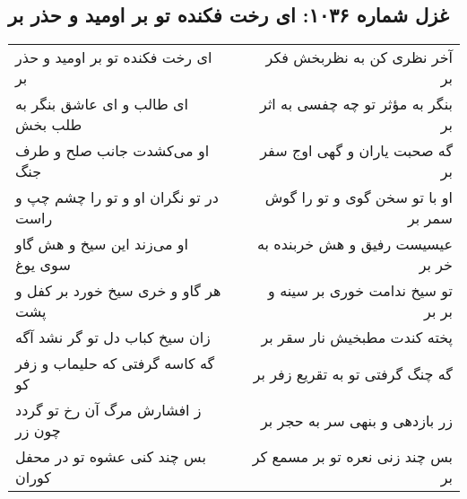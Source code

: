 \begin{center}
\section*{غزل شماره ۱۰۳۶: ای رخت فکنده تو بر اومید و حذر بر}
\label{sec:1036}
\begin{longtable}{l p{0.5cm} r}
ای رخت فکنده تو بر اومید و حذر بر
&&
آخر نظری کن به نظربخش فکر بر
\\
ای طالب و ای عاشق بنگر به طلب بخش
&&
بنگر به مؤثر تو چه چفسی به اثر بر
\\
او می‌کشدت جانب صلح و طرف جنگ
&&
گه صحبت یاران و گهی اوج سفر بر
\\
در تو نگران او و تو را چشم چپ و راست
&&
او با تو سخن گوی و تو را گوش سمر بر
\\
او می‌زند این سیخ و هش گاو سوی یوغ
&&
عیسیست رفیق و هش خربنده به خر بر
\\
هر گاو و خری سیخ خورد بر کفل و پشت
&&
تو سیخ ندامت خوری بر سینه و بر بر
\\
زان سیخ کباب دل تو گر نشد آگه
&&
پخته کندت مطبخیش نار سقر بر
\\
گه کاسه گرفتی که حلیماب و زفر کو
&&
گه چنگ گرفتی تو به تقریع زفر بر
\\
ز افشارش مرگ آن رخ تو گردد چون زر
&&
زر بازدهی و بنهی سر به حجر بر
\\
بس چند کنی عشوه تو در محفل کوران
&&
بس چند زنی نعره تو بر مسمع کر بر
\\
\end{longtable}
\end{center}

